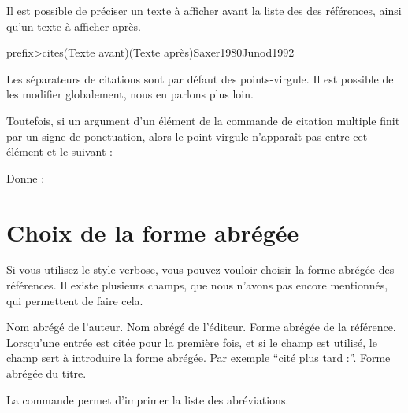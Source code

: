 \begin{latexcode}
\autocites{Saxer1980}{Junod1992}
\end{latexcode}

\begin{quotation}
\cites{Saxer1980}{Junod1992}
\end{quotation}

Il est possible de préciser un texte à afficher avant la liste des des références, ainsi qu'un texte à afficher après.

\begin{latexcode}
\<prefix>cites(Texte avant)(Texte après){Saxer1980}{Junod1992}
\end{latexcode}

Les séparateurs de citations sont par défaut des points-virgule. Il est possible de les modifier globalement, nous en parlons plus loin.

Toutefois, si un argument  d'un élément de la commande de citation multiple finit par un signe de ponctuation, alors le point-virgule n'apparaît pas entre cet élément et le suivant :

\begin{latexcode}
\autocites[on consultera également :]{Saxer1980}{Junod1992}
\end{latexcode}

Donne :

\begin{quotation}
\cites[on consultera également :]{Saxer1980}{Junod1992}
\end{quotation}




\section{Choix de la forme abrégée}\label{shortfields}

Si vous utilisez le style verbose, vous pouvez vouloir choisir la forme abrégée des références. Il existe plusieurs champs, que nous n'avons pas encore mentionnés, qui permettent de faire cela.

\begin{fieldlist}
     Nom abrégé de l'auteur.
     Nom abrégé de l'éditeur.
     Forme abrégée de la référence.
     Lorsqu'une entrée est citée pour la première fois, et si le champ  est utilisé, le champ  sert à introduire la forme abrégée. Par exemple \enquote{cité plus tard :}.
     Forme abrégée du titre.
\end{fieldlist}

La commande  permet d'imprimer la liste des abréviations.



